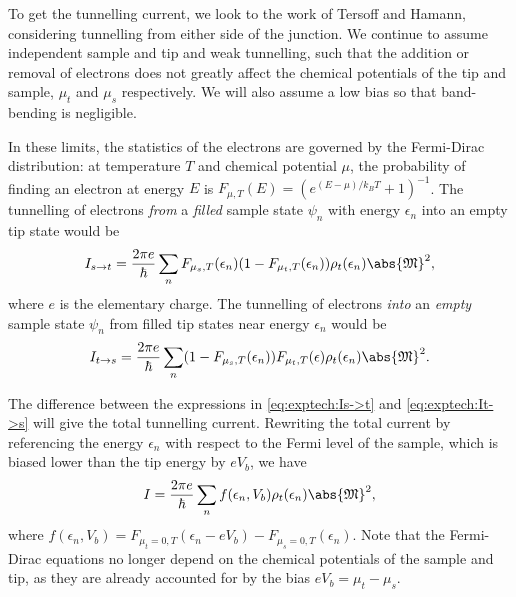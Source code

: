 To get the tunnelling current, we look to the work of Tersoff and Hamann, considering tunnelling from either side of the junction. We continue to assume independent sample and tip and weak tunnelling, such that the addition or removal of electrons does not greatly affect the chemical potentials of the tip and sample, $\mu_t$ and $\mu_s$ respectively. We will also assume a low bias so that band-bending is negligible.

In these limits, the statistics of the electrons are governed by the Fermi-Dirac distribution: at temperature $T$ and chemical potential $\mu$, the probability of finding an electron at energy $E$ is $F_{\mu, T}(E) = ({e^{(E-\mu)/k_BT} +1})^{-1}$. The tunnelling of electrons \emph{from} a \emph{filled} sample state $\psi_n$ with energy $\epsilon_n$ into an empty tip state would be
\begin{equation} \label{eq:exptech:Is->t}
    I_{s\rightarrow t} = \frac{2\pi e}{\hbar} \sum_n F_{\mu_s, T}(\epsilon_n) (1-F_{\mu_t, T}(\epsilon_n))  \rho_{t}(\epsilon_n) \abs{\mathfrak{M}}^2 ,
\end{equation}
where $e$ is the elementary charge. The tunnelling of electrons \emph{into} an \emph{empty} sample state $\psi_n$ from filled tip states near energy $\epsilon_n$ would be 
\begin{equation} \label{eq:exptech:It->s}
    I_{t\rightarrow s} = \frac{2\pi e}{\hbar} \sum_n (1-F_{\mu_s, T}(\epsilon_n))   F_{\mu_t, T}(\epsilon)  \rho_{t}(\epsilon_n) \abs{\mathfrak{M}}^2 .
\end{equation}

The difference between the expressions in \autoref{eq:exptech:Is->t} and \ref{eq:exptech:It->s} will give the total tunnelling current. Rewriting the total current by referencing the energy $\epsilon_n$ with respect to the Fermi level of the sample, which is biased lower than the tip energy by $eV_b$, we have
\begin{equation} 
I = \frac{2\pi e}{\hbar}\sum_n f(\epsilon_n, V_b) \rho_{t}(\epsilon_n) \abs{\mathfrak{M}}^2,
\end{equation}
where $ f(\epsilon_n,V_b) = F_{\mu_t=0,T}(\epsilon_n-eV_b) - F_{\mu_s=0,T}(\epsilon_n)$. Note that the Fermi-Dirac equations no longer depend on the chemical potentials of the sample and tip, as they are already accounted for by the bias $eV_b = \mu_t - \mu_s$. 


